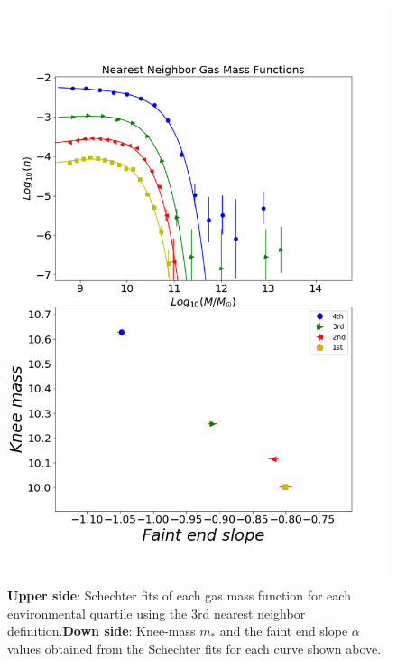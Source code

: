 \documentclass[a4paper,fleqn,usenatbib]{mnras}
\begin{document}
\begin{figure}
	\includegraphics[width=\columnwidth]{./pics/quartilesGas.png}
    \caption{\textbf{Upper side}: Schechter fits of each gas mass
      function for each environmental quartile using the 3rd nearest
      neighbor definition.\textbf{Down side}: Knee-mass $m_\ast$ and
      the faint end slope $\alpha$ values obtained from the Schechter
      fits for each curve shown above.} 
    \label{fig:quartilesGas}
\end{figure}
\end{document}
